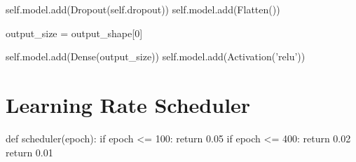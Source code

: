 \begin{appendices}
\begin{python}
        self.model.add(Dropout(self.dropout))
        self.model.add(Flatten())
        
        output_size = output_shape[0]

        self.model.add(Dense(output_size))
        self.model.add(Activation('relu'))
\end{python}

\section{Learning Rate Scheduler}
\label{lr}
\begin{python}
def scheduler(epoch):
    if epoch <= 100:
        return 0.05
    if epoch <= 400:
        return 0.02
    return 0.01
\end{python}
    
\end{appendices}